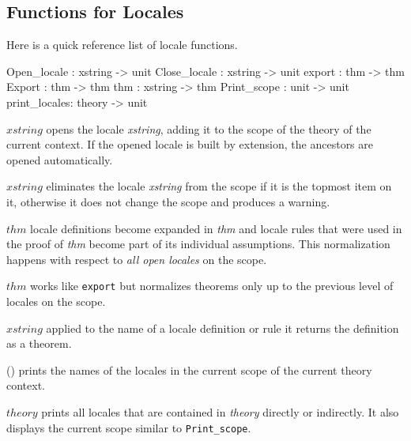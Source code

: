 \subsection{Functions for Locales}
\label{Syntax}

Here is a quick reference list of locale functions.
\begin{ttbox}
  Open_locale  : xstring -> unit 
  Close_locale : xstring -> unit
  export       :     thm -> thm
  Export       :     thm -> thm
  thm          : xstring -> thm
  Print_scope  :    unit -> unit
  print_locales:  theory -> unit
\end{ttbox}
\begin{ttdescription}
\item[\ttindexbold{Open_locale} $xstring$] 
    opens the locale {\it xstring}, adding it to the scope of the theory of the
  current context.  If the opened locale is built by extension, the ancestors
  are opened automatically.
  
\item[\ttindexbold{Close_locale} $xstring$] eliminates the locale {\it
    xstring} from the scope if it is the topmost item on it, otherwise it does
  not change the scope and produces a warning.

\item[\ttindexbold{export} $thm$] locale definitions become expanded in {\it
    thm} and locale rules that were used in the proof of {\it thm} become part
  of its individual assumptions.  This normalization happens with respect to
  \emph{all open locales} on the scope.
  
\item[\ttindexbold{Export} $thm$] works like \texttt{export} but normalizes
  theorems only up to the previous level of locales on the scope.
  
\item[\ttindexbold{thm} $xstring$] applied to the name of a locale definition
  or rule it returns the definition as a theorem.
  
\item[\ttindexbold{Print_scope}()] prints the names of the locales in the
  current scope of the current theory context.
  
\item[\ttindexbold{print_locale} $theory$] prints all locales that are
  contained in {\it theory} directly or indirectly.  It also displays the
  current scope similar to \texttt{Print\_scope}.
\end{ttdescription}


